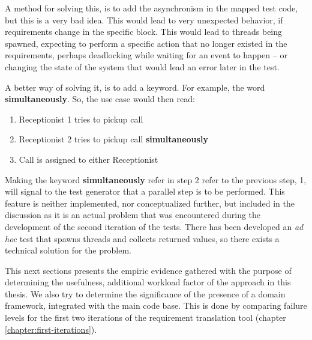 \noindent A method for solving this, is to add the asynchronism in the mapped test code, but this is a very bad idea. This would lead to very unexpected behavior, if requirements change in the specific block. This would lead to threads being spawned, expecting to perform a specific action that no longer existed in the requirements, perhaps deadlocking while waiting for an event to happen -- or changing the state of the system that would lead an error later in the test.\medskip

\noindent A better way of solving it, is to add a keyword. For example, the word \textbf{simultaneously}. So, the use case would then read:
\begin{enumerate}
 \item Receptionist 1 tries to pickup call
 \item Receptionist 2 tries to pickup call \textbf{simultaneously}
 \item Call is assigned to either Receptionist
\end{enumerate}
Making the keyword \textbf{simultaneously} refer in step 2 refer to the previous step, 1, will signal to the test generator that a parallel step is to be performed. This feature is neither implemented, nor conceptualized further, but included in the discussion as it is an actual problem that was encountered during the development of the second iteration of the tests. There has been developed an \emph{ad hoc} test that spawns threads and collects returned values, so there exists a technical solution for the problem.\bigskip


\noindent
This next sections presents the empiric evidence gathered with the purpose of determining the usefulness, additional workload factor of the approach in this thesis. We also try to determine the significance of the presence of a domain framework, integrated with the main code base. This is done by comparing failure levels for the first two iterations of the requirement translation tool (chapter \ref{chapter:first-iterations}).
